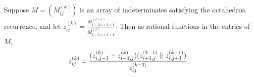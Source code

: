 \documentclass[11pt]{article}
\theoremstyle{definition}
\numberwithin{equation}{section}
\numberwithin{equation}{section}
\newcommand{\parallelsum}{\:\ \mathclap{\|}\mathclap{-}\ \:}
\begin{document}
\begin{Lemma}\label{lemma:arraytoggle}
Suppose $M = (M_{ij}^{(k)})$ is an array of indeterminates satisfying the octahedron recurrence, and let $z_{ij}^{(k)} = \frac{M_{k+2,i+k+1}^{(j-1)}}{M_{k+1,i+k+1}^{(j)}}$.
Then as rational functions in the entries of $M$, \[z_{ij}^{(k)} = \frac{(z_{i,j-1}^{(k)}+z_{i-1,j}^{(k)})(z_{i+1,j}^{(k-1)}\parallelsum z_{i,j+1}^{(k-1)})}{z_{ij}^{(k-1)}}.\]





\end{Lemma}
\end{document}
